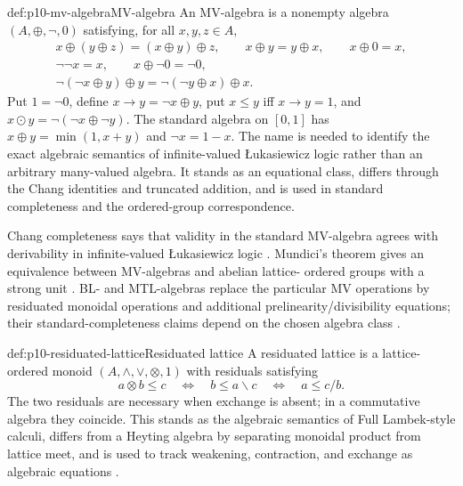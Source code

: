 \begin{hbdefinition}{def:p10-mv-algebra}{MV-algebra}
An MV-algebra is a nonempty algebra \((A,\oplus,\neg,0)\) satisfying, for all
\(x,y,z\in A\),
\[
\begin{gathered}
x\oplus(y\oplus z)=(x\oplus y)\oplus z,\qquad
x\oplus y=y\oplus x,\qquad x\oplus0=x,\\
\neg\neg x=x,\qquad x\oplus\neg0=\neg0,\\
\neg(\neg x\oplus y)\oplus y
=\neg(\neg y\oplus x)\oplus x.
\end{gathered}
\]
Put \(1=\neg0\), define \(x\to y=\neg x\oplus y\), put
\(x\le y\) iff \(x\to y=1\), and
\(x\odot y=\neg(\neg x\oplus\neg y)\). The standard algebra on \([0,1]\) has
\(x\oplus y=\min(1,x+y)\) and \(\neg x=1-x\). The name is needed to identify
the exact algebraic semantics of infinite-valued \L{}ukasiewicz logic rather
than an arbitrary many-valued algebra. It stands as an equational class,
differs through the Chang identities and truncated addition, and is used in
standard completeness and the ordered-group correspondence.
\end{hbdefinition}

Chang completeness says that validity in the standard MV-algebra agrees with
derivability in infinite-valued \L{}ukasiewicz logic \cite{Chang1958,Chang1959}.
Mundici's theorem gives an equivalence between MV-algebras and abelian lattice-
ordered groups with a strong unit \cite{Mundici1986}. BL- and MTL-algebras
replace the particular MV operations by residuated monoidal operations and
additional prelinearity/divisibility equations; their standard-completeness
claims depend on the chosen algebra class \cite{Hajek1998,
CignoliDOttavianoMundici2000}.

\begin{hbdefinition}{def:p10-residuated-lattice}{Residuated lattice}
A residuated lattice is a lattice-ordered monoid
\((A,\wedge,\vee,\otimes,1)\) with residuals satisfying
\[
 a\otimes b\le c
 \quad\Longleftrightarrow\quad
 b\le a\backslash c
 \quad\Longleftrightarrow\quad
 a\le c/b.
\]
The two residuals are necessary when exchange is absent; in a commutative
algebra they coincide. This stands as the algebraic semantics of Full
Lambek-style calculi, differs from a Heyting algebra by separating monoidal
product from lattice meet, and is used to track weakening, contraction, and
exchange as algebraic equations \cite{OnoKomori1985,
GalatosJipsenKowalskiOno2007}.
\end{hbdefinition}

